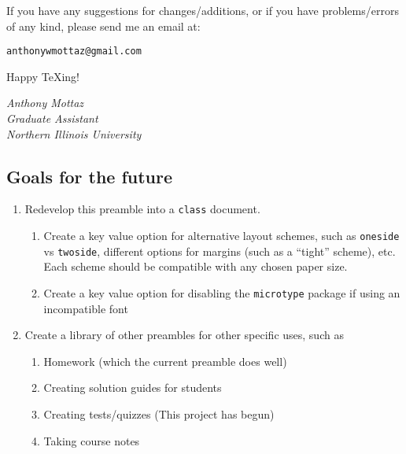 \documentclass[letterpaper,12pt]{article}
\begin{document}
If you have any suggestions for changes/additions, or if you have problems/errors of any kind, please send me an email at:
\begin{center}
\texttt{anthonywmottaz@gmail.com}
\end{center}

Happy \TeX ing!

\medskip
{\slshape Anthony Mottaz \\ Graduate Assistant \\ Northern Illinois University}

\newpage
	\subsection{Goals for the future}
	\begin{enumerate}[\bfseries I.]
	
	\item Redevelop this preamble into a \texttt{class} document.
		
		\begin{enumerate}[\bfseries i.]
		
		\item Create a key value option for alternative layout schemes, such as \texttt{oneside} vs \texttt{twoside}, different options for margins (such as a ``tight'' scheme), etc. Each scheme should be compatible with any chosen paper size.
		
		\item Create a key value option for disabling the \texttt{microtype} package if using an incompatible font
	
		\end{enumerate}
	
	\item Create a library of other preambles for other specific uses, such as
	
		\begin{enumerate}[\bfseries i.]
		
		\item Homework (which the current preamble does well)
		
		\item Creating solution guides for students
		
		\item Creating tests/quizzes (This project has begun)

        \item Taking course notes
		
		\end{enumerate}
	

\end{enumerate}
\end{document}
